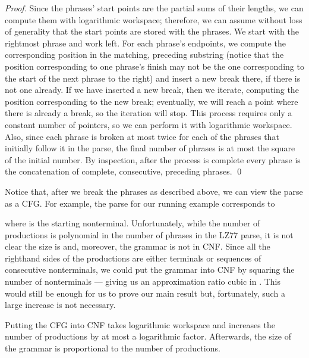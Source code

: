 \documentclass[runningheads]{llncs}
\begin{document}
\begin{proof}
Since the phrases' start points are the partial sums of their lengths, we can compute them with logarithmic workspace; therefore, we can assume without loss of generality that the start points are stored with the phrases.  We start with the rightmost phrase and work left.  For each phrase's endpoints, we compute the corresponding position in the matching, preceding substring (notice that the position corresponding to one phrase's finish may not be the one corresponding to the start of the next phrase to the right) and insert a new break there, if there is not one already.  If we have inserted a new break, then we iterate, computing the position corresponding to the new break; eventually, we will reach a point where there is already a break, so the iteration will stop.  This process requires only a constant number of pointers, so we can perform it with logarithmic workspace.  Also, since each phrase is broken at most twice for each of the phrases that initially follow it in the parse, the final number of phrases is at most the square of the initial number.  By inspection, after the process is complete every phrase is the concatenation of complete, consecutive, preceding phrases. \qed
\end{proof}

Notice that, after we break the phrases as described above, we can view the parse as a CFG.  For example, the parse for our running example corresponds to

where  is the starting nonterminal.  Unfortunately, while the number of productions is polynomial in the number of phrases in the LZ77 parse, it is not clear the size is and, moreover, the grammar is not in CNF.  Since all the righthand sides of the productions are either terminals or sequences of consecutive nonterminals, we could put the grammar into CNF by squaring the number of nonterminals --- giving us an approximation ratio cubic in .  This would still be enough for us to prove our main result but, fortunately, such a large increase is not necessary.

\begin{lemma} \label{lem:cnf}
Putting the CFG into CNF takes logarithmic workspace and increases the number of productions by at most a logarithmic factor.  Afterwards, the size of the grammar is proportional to the number of productions.
\end{lemma}
\end{document}
